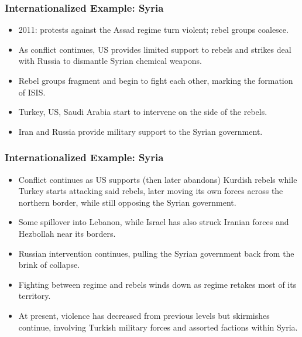 \documentclass[handout]{beamer}
\begin{document}
\begin{frame} 
	\frametitle{\LARGE{Internationalized Example: Syria}}
	\begin{itemize}
		\item 2011: protests against the Assad regime turn violent; rebel groups coalesce. \pause
		\item As conflict continues, US provides limited support to rebels and strikes deal with Russia to dismantle Syrian chemical weapons.\pause
		\item Rebel groups fragment and begin to fight each other, marking the formation of ISIS.\pause
		\item Turkey, US, Saudi Arabia start to intervene on the side of the rebels.\pause
		\item Iran and Russia provide military support to the Syrian government.
	\end{itemize}
\end{frame}

\begin{frame} 
	\frametitle{\LARGE{Internationalized Example: Syria}}
	\begin{itemize}
		\item Conflict continues as US supports (then later abandons) Kurdish rebels while Turkey starts attacking said rebels, later moving its own forces across the northern border, while still opposing the Syrian government. \pause
		\item Some spillover into Lebanon, while Israel has also struck Iranian forces and Hezbollah near its borders. \pause
		\item Russian intervention continues, pulling the Syrian government back from the brink of collapse. \pause
		\item Fighting between regime and rebels winds down as regime retakes most of its territory. \pause
		\item At present, violence has decreased from previous levels but skirmishes continue, involving Turkish military forces and assorted factions within Syria.
		
	\end{itemize}
\end{frame}
\end{document}
